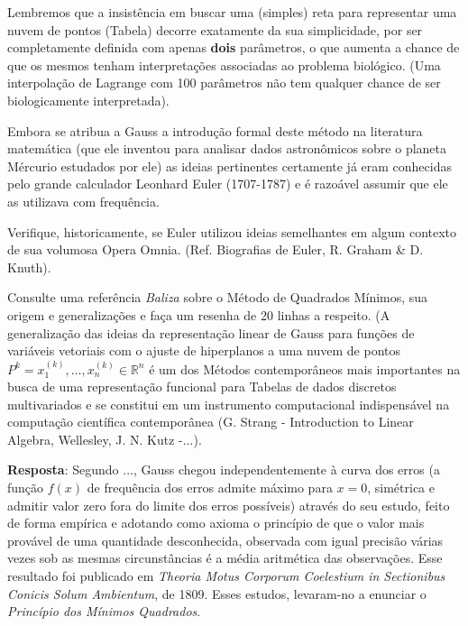     Lembremos que a insistência em buscar uma (simples) reta para representar uma nuvem de pontos (Tabela) decorre exatamente da sua simplicidade, por ser completamente definida com apenas \textbf{dois} parâmetros, o que aumenta a chance de que os mesmos tenham interpretações associadas ao problema biológico. (Uma interpolação de Lagrange com 100 parâmetros não tem qualquer chance de ser biologicamente interpretada).

    Embora se atribua a Gauss a introdução formal deste método na literatura matemática (que ele inventou para analisar dados astronômicos sobre o planeta Mércurio estudados por ele) as ideias pertinentes certamente já eram conhecidas pelo grande calculador Leonhard Euler (1707-1787) e é razoável assumir que ele as utilizava com frequência.


\begin{exercise}
Verifique, historicamente, se Euler utilizou ideias semelhantes em algum contexto de sua volumosa Opera Omnia. (Ref. Biografias de Euler, R. Graham \& D. Knuth).
\end{exercise}

\begin{exercise}
Consulte uma referência \textit{Baliza} sobre o Método de Quadrados Mínimos, sua origem e generalizações e faça um resenha de 20 linhas a respeito. (A generalização das ideias da
representação linear de Gauss para funções de variáveis vetoriais com o ajuste de hiperplanos a uma nuvem de pontos \(P^k = x_1^{(k)}, \ldots, x_n^{(k)} \in \mathbb{R}^n\) é um dos Métodos contemporâneos mais importantes na busca de uma representação funcional para Tabelas de dados discretos multivariados e se constitui em um instrumento computacional indispensável na computação científica contemporânea (G. Strang - Introduction to Linear Algebra, Wellesley, J. N. Kutz -...).
\end{exercise}

{\red 
\textbf{Resposta}: Segundo ..., Gauss chegou independentemente à curva dos erros (a função \(f(x)\) de frequência dos erros admite máximo para \(x=0\), simétrica e admitir valor zero fora do limite dos erros possíveis) através do seu estudo, feito de forma empírica e adotando como axioma o princípio de que o valor mais provável de uma quantidade desconhecida, observada com igual precisão várias vezes sob as mesmas circunstâncias é a média aritmética das observações. Esse resultado foi publicado em \textit{Theoria Motus Corporum Coelestium in Sectionibus Conicis Solum Ambientum}, de 1809. Esses estudos, levaram-no a enunciar o \textit{Princípio dos Mínimos Quadrados}.
}


